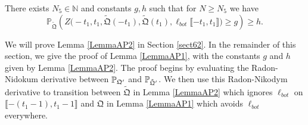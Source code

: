 \begin{lemma}\label{LemmaAP2} There exists $N_5 \in \mathbb{N}$ and constants $g,h$ such that for $N \geq N_5$ we have
	\begin{equation}\label{eqn57}
		\mathbb{P}_{\tilde{\mathfrak{Q}}} \left( Z\big(  -t_1, t_1, \tilde{\mathfrak{Q}}(-t_1) , \tilde{\mathfrak{Q}}(t_1), \ell_{bot}\llbracket -t_1, t_1\rrbracket\big)\geq g    \right) \geq h.
	\end{equation}
\end{lemma}
We will prove Lemma \ref{LemmaAP2} in Section \ref{sect62}. In the remainder of this section, we give the proof of Lemma \ref{LemmaAP1}, with the constants $g$ and $h$ given by Lemma \ref{LemmaAP2}. The proof begins by evaluating the Radon-Nidokum derivative between $\mathbb{P}_{\mathfrak{Q}'}$ and $\mathbb{P}_{\tilde{\mathfrak{Q}}'}$. We then use this Radon-Nikodym derivative to transition between $\tilde{\mathfrak{Q}}$ in Lemma \ref{LemmaAP2} which ignores $\ell_{bot}$ on $\llbracket -(t_1-1),t_1-1\rrbracket$ and $\mathfrak{Q}$ in Lemma \ref{LemmaAP1} which avoids $\ell_{bot}$ everywhere. 

